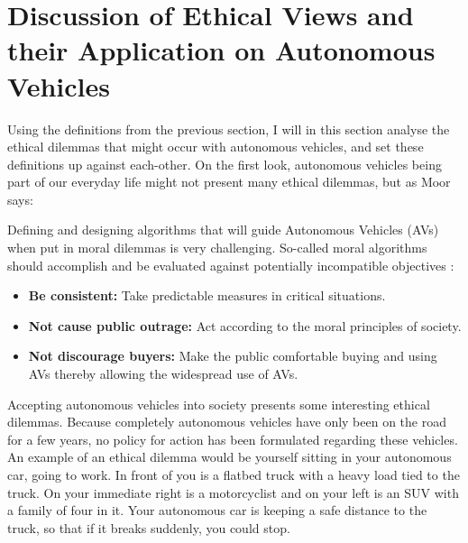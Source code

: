 \chapter{Discussion of Ethical Views and their Application on Autonomous Vehicles}

Using the definitions from the previous section, I will in this section analyse the ethical dilemmas that might occur with autonomous vehicles, and set these definitions up against each-other. On the first look, autonomous vehicles being part of our everyday life might not present many ethical dilemmas, but as Moor says: 

\begin{quote}	
	 \cite{moor1985computer}
\end{quote}

\noindent Defining and designing algorithms that will guide Autonomous Vehicles (AVs) when put in moral dilemmas is very challenging. So-called moral algorithms should accomplish and be evaluated against potentially incompatible objectives \cite{10.2307/2027067}:

\begin{itemize}
	\item \textbf{Be consistent:} Take predictable measures in critical situations.
	\item \textbf{Not cause public outrage:} Act according to the moral principles of society.
	\item \textbf{Not discourage buyers:} Make the public comfortable buying and using AVs thereby allowing the widespread use of AVs. 
\end{itemize}

\newpar Accepting autonomous vehicles into society presents some interesting ethical dilemmas. Because completely autonomous vehicles have only been on the road for a few years, no policy for action has been formulated regarding these vehicles. An example of an ethical dilemma would be yourself sitting in your autonomous car, going to work. In front of you is a flatbed truck with a heavy load tied to the truck. On your immediate right is a motorcyclist and on your left is an SUV with a family of four in it. Your autonomous car is keeping a safe distance to the truck, so that if it breaks suddenly, you could stop. 

